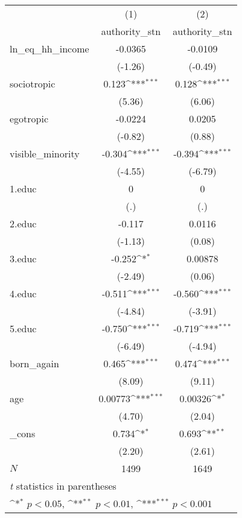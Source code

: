 {
\def\sym#1{\ifmmode^{#1}\else\(^{#1}\)\fi}
\begin{tabular}{l*{2}{c}}
\hline\hline
            &\multicolumn{1}{c}{(1)}&\multicolumn{1}{c}{(2)}\\
            &\multicolumn{1}{c}{authority\_stn}&\multicolumn{1}{c}{authority\_stn}\\
\hline
ln\_eq\_hh\_income&     -0.0365         &     -0.0109         \\
            &     (-1.26)         &     (-0.49)         \\
[1em]
sociotropic &       0.123\sym{***}&       0.128\sym{***}\\
            &      (5.36)         &      (6.06)         \\
[1em]
egotropic   &     -0.0224         &      0.0205         \\
            &     (-0.82)         &      (0.88)         \\
[1em]
visible\_minority&      -0.304\sym{***}&      -0.394\sym{***}\\
            &     (-4.55)         &     (-6.79)         \\
[1em]
1.educ      &           0         &           0         \\
            &         (.)         &         (.)         \\
[1em]
2.educ      &      -0.117         &      0.0116         \\
            &     (-1.13)         &      (0.08)         \\
[1em]
3.educ      &      -0.252\sym{*}  &     0.00878         \\
            &     (-2.49)         &      (0.06)         \\
[1em]
4.educ      &      -0.511\sym{***}&      -0.560\sym{***}\\
            &     (-4.84)         &     (-3.91)         \\
[1em]
5.educ      &      -0.750\sym{***}&      -0.719\sym{***}\\
            &     (-6.49)         &     (-4.94)         \\
[1em]
born\_again  &       0.465\sym{***}&       0.474\sym{***}\\
            &      (8.09)         &      (9.11)         \\
[1em]
age         &     0.00773\sym{***}&     0.00326\sym{*}  \\
            &      (4.70)         &      (2.04)         \\
[1em]
\_cons      &       0.734\sym{*}  &       0.693\sym{**} \\
            &      (2.20)         &      (2.61)         \\
\hline
\(N\)       &        1499         &        1649         \\
\hline\hline
\multicolumn{3}{l}{\footnotesize \textit{t} statistics in parentheses}\\
\multicolumn{3}{l}{\footnotesize \sym{*} \(p<0.05\), \sym{**} \(p<0.01\), \sym{***} \(p<0.001\)}\\
\end{tabular}
}
